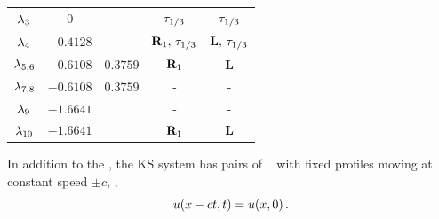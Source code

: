 \begin{table}[t]
\begin{center}
\begin{tabular}{ccccc}
  $\eigExp[3]$   &$0$       &          & $\Shift_{1/3}$    & $\Shift_{1/3}$\\
  $\eigExp[4]$   &$-0.4128$ &          & $\Refl_1,\,\Shift_{1/3}$  & $\mathbf{L},\,\Shift_{1/3}$\\
  $\eigExp[5,6]$ &$-0.6108$ & $0.3759$ & $\Refl_1$     & $\mathbf{L}$\\
  $\eigExp[7,8]$ &$-0.6108$ & $0.3759$ & -         & -\\
  $\eigExp[9]$   &$-1.6641$ &          & -         & -\\
  $\eigExp[10]$  &$-1.6641$ &          & $\Refl_1$     & $\mathbf{L}$ \\\hline
\end{tabular}
\end{center}
\end{table}

In addition to the \eqva, the KS system has pairs of
\reqva\  with fixed profiles
moving at constant speed $\pm c$, \ie,
\[
u(x \PCedit{-} ct,t) = u(x, 0)\,.
\]

